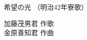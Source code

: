 \documentclass[10pt,b5j]{tarticle} %
\begin{document}
\begin{minipage}[c]{0.7\hsize} %
    \begin{center}
        {\LARGE
            希望の光 %
        }
        {\small 
            （明治42年寮歌） %
        }
    \end{center}
\end{minipage}
\begin{minipage}[c]{0.3\hsize} %
    \begin{flushright} %
        加藤茂男君 作歌\\金原善知君 作曲 %
    \end{flushright}
\end{minipage}
\end{document}
